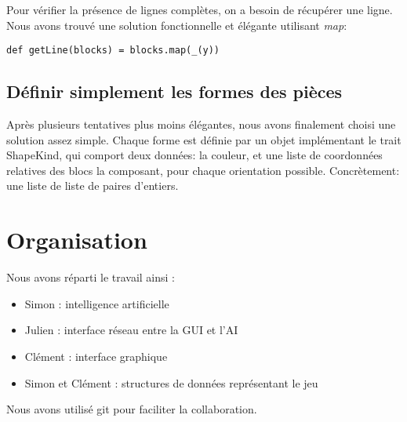 \documentclass[11pt]{article}
\begin{document}
Pour vérifier la présence de lignes complètes, on a besoin de récupérer une ligne. Nous avons trouvé une solution fonctionnelle et élégante utilisant \emph{map}:

\begin{verbatim}
def getLine(blocks) = blocks.map(_(y))
\end{verbatim}
\subsection{Définir simplement les formes des pièces}
\label{sec-3-2}

Après plusieurs tentatives plus moins élégantes, nous avons finalement
choisi une solution assez simple. Chaque forme est définie par un
objet implémentant le trait ShapeKind, qui comport deux données: la
couleur, et une liste de coordonnées relatives des blocs la composant,
pour chaque orientation possible. Concrètement: une liste de liste de
paires d'entiers.

\section{Organisation}
\label{sec-4}

Nous avons réparti le travail ainsi :

\begin{itemize}
\item Simon : intelligence artificielle
\item Julien : interface réseau entre la GUI et l'AI
\item Clément : interface graphique
\item Simon et Clément : structures de données représentant le jeu
\end{itemize}

Nous avons utilisé git pour faciliter la collaboration.
\end{document}
